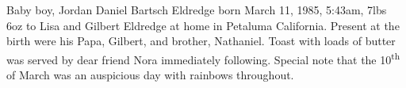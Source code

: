 Baby boy, Jordan Daniel Bartsch Eldredge born March 11, 1985, 5:43am, 7lbs 6oz
to Lisa and Gilbert Eldredge at home in Petaluma California.  Present at the
birth were his Papa, Gilbert, and brother, Nathaniel.  Toast with loads of
butter was served by dear friend Nora immediately following.  Special note that
the 10\textsuperscript{th} of March was an auspicious day with rainbows
throughout.

